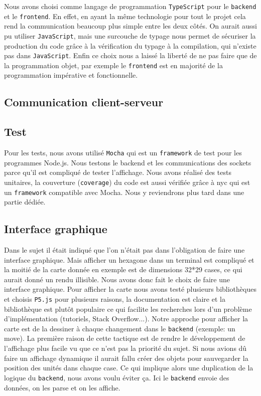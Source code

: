 Nous avons choisi comme langage de programmation \lstinline{TypeScript} pour le \lstinline{backend} et le \lstinline{frontend}. En effet, en ayant la même technologie pour tout le projet cela rend la communication beaucoup plus simple entre les deux côtés. On aurait aussi pu utiliser \lstinline{JavaScript}, mais une surcouche de typage nous permet de sécuriser la production du code grâce à la vérification du typage à la compilation, qui n'existe pas dans \lstinline{JavaScript}. Enfin ce choix nous a laissé la liberté de ne pas faire que de la programmation objet, par exemple le \lstinline{frontend} est en majorité de la programmation impérative et fonctionnelle.

\subsection{Communication client-serveur}



\subsection{Test}

Pour les tests, nous avons utilisé {\tt Mocha} qui est un {\tt framework} de test pour les programmes Node.js.
Nous testons le backend et les communications des sockets parce qu'il est compliqué de tester l'affichage.
Nous avons réalisé des tests unitaires, la couverture ({\tt coverage}) du code est aussi vérifiée grâce à nyc qui est un {\tt framework} compatible avec Mocha.
Nous y reviendrons plus tard dans une partie dédiée.

\subsection{Interface graphique}

Dans le sujet il était indiqué que l'on n'était pas dans l'obligation de faire une interface graphique. Mais afficher un hexagone dans un terminal est compliqué et la moitié de la carte donnée en exemple est de dimensions 32*29 cases, ce qui aurait donné un rendu illisible. Nous avons donc fait le choix de faire une interface graphique. Pour afficher la carte nous avons testé plusieurs bibliothèques et choisis \lstinline{P5.js} pour plusieurs raisons, la documentation est claire et la bibliothèque est plutôt populaire ce qui facilite les recherches lors d'un problème d'implémentation (tutoriels, Stack Overflow...).
Notre approche pour afficher la carte est de la dessiner à chaque changement dans le \lstinline{backend} (exemple: un move). La première raison de cette tactique est de rendre le développement de l'affichage plus facile vu que ce n'est pas la priorité du sujet. Si nous avions dû faire un affichage dynamique il aurait fallu créer des objets pour sauvegarder la position des unités dans chaque case. Ce qui implique alors une duplication de la logique du \lstinline{backend}, nous avons voulu éviter ça. Ici le \lstinline{backend} envoie des données, on les parse et on les affiche.


